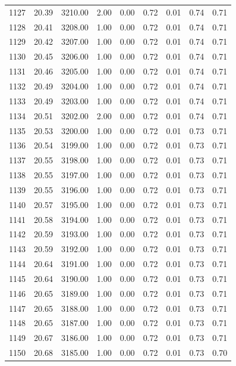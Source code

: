 \documentclass{article}\usepackage[]{graphicx}\usepackage[]{color}
\begin{document}
\begin{longtable}{rrrrrrrrr}
  1127 & 20.39 & 3210.00 & 2.00 & 0.00 & 0.72 & 0.01 & 0.74 & 0.71 \\ 
  1128 & 20.41 & 3208.00 & 1.00 & 0.00 & 0.72 & 0.01 & 0.74 & 0.71 \\ 
  1129 & 20.42 & 3207.00 & 1.00 & 0.00 & 0.72 & 0.01 & 0.74 & 0.71 \\ 
  1130 & 20.45 & 3206.00 & 1.00 & 0.00 & 0.72 & 0.01 & 0.74 & 0.71 \\ 
  1131 & 20.46 & 3205.00 & 1.00 & 0.00 & 0.72 & 0.01 & 0.74 & 0.71 \\ 
  1132 & 20.49 & 3204.00 & 1.00 & 0.00 & 0.72 & 0.01 & 0.74 & 0.71 \\ 
  1133 & 20.49 & 3203.00 & 1.00 & 0.00 & 0.72 & 0.01 & 0.74 & 0.71 \\ 
  1134 & 20.51 & 3202.00 & 2.00 & 0.00 & 0.72 & 0.01 & 0.74 & 0.71 \\ 
  1135 & 20.53 & 3200.00 & 1.00 & 0.00 & 0.72 & 0.01 & 0.73 & 0.71 \\ 
  1136 & 20.54 & 3199.00 & 1.00 & 0.00 & 0.72 & 0.01 & 0.73 & 0.71 \\ 
  1137 & 20.55 & 3198.00 & 1.00 & 0.00 & 0.72 & 0.01 & 0.73 & 0.71 \\ 
  1138 & 20.55 & 3197.00 & 1.00 & 0.00 & 0.72 & 0.01 & 0.73 & 0.71 \\ 
  1139 & 20.55 & 3196.00 & 1.00 & 0.00 & 0.72 & 0.01 & 0.73 & 0.71 \\ 
  1140 & 20.57 & 3195.00 & 1.00 & 0.00 & 0.72 & 0.01 & 0.73 & 0.71 \\ 
  1141 & 20.58 & 3194.00 & 1.00 & 0.00 & 0.72 & 0.01 & 0.73 & 0.71 \\ 
  1142 & 20.59 & 3193.00 & 1.00 & 0.00 & 0.72 & 0.01 & 0.73 & 0.71 \\ 
  1143 & 20.59 & 3192.00 & 1.00 & 0.00 & 0.72 & 0.01 & 0.73 & 0.71 \\ 
  1144 & 20.64 & 3191.00 & 1.00 & 0.00 & 0.72 & 0.01 & 0.73 & 0.71 \\ 
  1145 & 20.64 & 3190.00 & 1.00 & 0.00 & 0.72 & 0.01 & 0.73 & 0.71 \\ 
  1146 & 20.65 & 3189.00 & 1.00 & 0.00 & 0.72 & 0.01 & 0.73 & 0.71 \\ 
  1147 & 20.65 & 3188.00 & 1.00 & 0.00 & 0.72 & 0.01 & 0.73 & 0.71 \\ 
  1148 & 20.65 & 3187.00 & 1.00 & 0.00 & 0.72 & 0.01 & 0.73 & 0.71 \\ 
  1149 & 20.67 & 3186.00 & 1.00 & 0.00 & 0.72 & 0.01 & 0.73 & 0.71 \\ 
  1150 & 20.68 & 3185.00 & 1.00 & 0.00 & 0.72 & 0.01 & 0.73 & 0.70 \\ 

\end{longtable}
\end{document}
